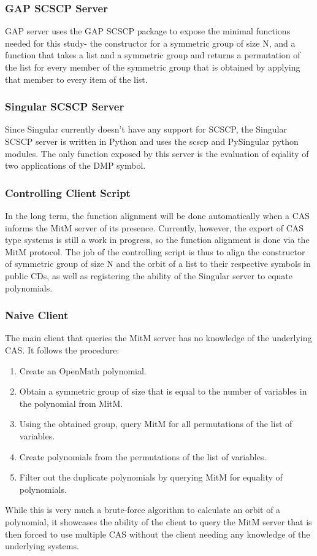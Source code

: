 \subsubsection{GAP SCSCP Server}
GAP server uses the GAP SCSCP package to expose the minimal functions needed for 
this study- the constructor for a symmetric group of size N, and a function that
takes a list and a symmetric group and returns a permutation of the list for every 
member of the symmetric group that is obtained by applying that member to every
item of the list.

\subsubsection{Singular SCSCP Server}
Since Singular currently doesn't have any support for SCSCP, the Singular SCSCP 
server is written in Python and uses the scscp and PySingular python modules. The 
only function exposed by this server is the evaluation of eqiality of two 
applications of the DMP symbol.

\subsubsection{Controlling Client Script}
In the long term, the function alignment will be done automatically when a CAS 
informs the MitM server of its presence. Currently, however, the export of CAS 
type systems is still a work in progress, so the function alignment is done
via the MitM protocol. The job of the controlling script is thus to align the 
constructor of symmetric group of size N and the orbit of a list to their 
respective symbols in public CDs, as well as registering the ability of the 
Singular server to equate polynomials.

\subsubsection{Naive Client}
The main client that queries the MitM server has no knowledge of the underlying 
CAS. It follows the procedure:
\begin{enumerate}
  \item Create an OpenMath polynomial.
  \item Obtain a symmetric group of size that is equal to the number of variables 
    in the polynomial from MitM.
  \item Using the obtained group, query MitM for all permutations of the list 
    of variables.
  \item Create polynomials from the permutations of the list of variables.
  \item Filter out the duplicate polynomials by querying MitM for equality of 
    polynomials.
\end{enumerate}
While this is very much a brute-force algorithm to calculate an orbit of a
polynomial, it showcases the ability of the client to query the MitM server that 
is then forced to use multiple CAS without the client needing any knowledge of the
underlying systems.

